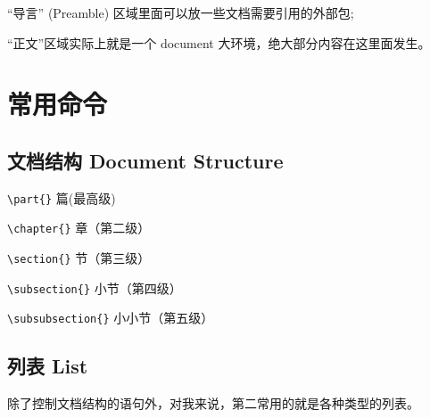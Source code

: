 %     
%     


“导言” (Preamble) 区域里面可以放一些文档需要引用的外部包; \par
“正文”区域实际上就是一个 document 大环境，绝大部分内容在这里面发生。 \par

\section{常用命令}
\subsection{文档结构 Document Structure}

\verb=\part{}= 篇(最高级) \par
\verb=\chapter{}= 章（第二级） \par
\verb=\section{}= 节（第三级） \par
\verb=\subsection{}= 小节（第四级） \par
\verb=\subsubsection{}= 小小节（第五级） \par


\subsection{列表 List}
除了控制文档结构的语句外，对我来说，第二常用的就是各种类型的列表。

